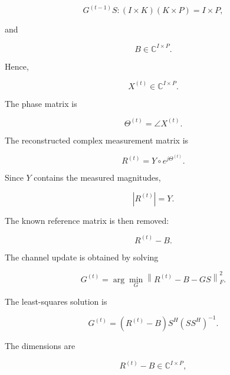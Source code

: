 \documentclass[12pt,a4paper]{article}
\begin{document}
\begin{equation}
G^{(t-1)}S:
(I\times K)(K\times P)
=
I\times P,
\tag{323}
\end{equation}

and

\begin{equation}
B\in\mathbb C^{I\times P}.
\tag{324}
\end{equation}

Hence,

\begin{equation}
\boxed{
X^{(t)}
\in
\mathbb C^{I\times P}
}.
\tag{325}
\end{equation}

The phase matrix is

\begin{equation}
\boxed{
\Theta^{(t)}
=
\angle X^{(t)}
}.
\tag{326}
\end{equation}

The reconstructed complex measurement matrix is

\begin{equation}
\boxed{
R^{(t)}
=
Y\circ
e^{j\Theta^{(t)}}
}.
\tag{327}
\end{equation}

Since $Y$ contains the measured magnitudes,

\begin{equation}
|R^{(t)}|
=
Y.
\tag{328}
\end{equation}

The known reference matrix is then removed:

\begin{equation}
\boxed{
R^{(t)}-B
}.
\tag{329}
\end{equation}

The channel update is obtained by solving

\begin{equation}
\boxed{
G^{(t)}
=
\arg\min_G
\left\|
R^{(t)}-B-GS
\right\|_F^2
}.
\tag{330}
\end{equation}

The least-squares solution is

\begin{equation}
\boxed{
G^{(t)}
=
(R^{(t)}-B)
S^H
(SS^H)^{-1}
}.
\tag{331}
\end{equation}

The dimensions are

\begin{equation}
R^{(t)}-B
\in
\mathbb C^{I\times P},
\tag{332}
\end{equation}
\end{document}
